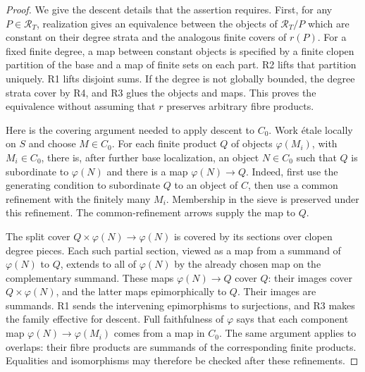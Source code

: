 \begin{proof}
We give the descent details that the assertion requires. First, for
any $P\in\mathscr R_T$, realization gives an equivalence between the
objects of $\mathscr R_T/P$ which are constant on their degree strata
and the analogous finite covers of $r(P)$. For a fixed finite degree,
a map between constant objects is specified by a finite clopen
partition of the base and a map of finite sets on each part. R2 lifts
that partition uniquely. R1 lifts disjoint sums. If the degree is not
globally bounded, the degree strata cover by R4, and R3 glues the
objects and maps. This proves the equivalence without assuming that
$r$ preserves arbitrary fibre products.

Here is the covering argument needed to apply descent to $C_0$.
Work \'etale locally on $S$ and choose $M\in C_0$. For each finite
product $Q$ of objects $\varphi(M_i)$, with $M_i\in C_0$, there
is, after further base localization, an object $N\in C_0$ such that
$Q$ is subordinate to $\varphi(N)$ and there is a map
$\varphi(N)\to Q$. Indeed, first use the generating condition to
subordinate $Q$ to an object of $C$, then use a common refinement
with the finitely many $M_i$. Membership in the sieve is preserved
under this refinement. The common-refinement arrows supply the
map to $Q$.

The split cover $Q\times\varphi(N)\to\varphi(N)$ is covered by
its sections over clopen degree pieces. Each such partial section,
viewed as a map from a summand of $\varphi(N)$ to $Q$, extends to
all of $\varphi(N)$ by the already chosen map on the complementary
summand. These maps $\varphi(N)\to Q$ cover $Q$: their images
cover $Q\times\varphi(N)$, and the latter maps epimorphically
to $Q$. Their images are summands. R1 sends the intervening
epimorphisms to surjections, and R3 makes the family effective for
descent. Full faithfulness of $\varphi$ says that each component
map $\varphi(N)\to\varphi(M_i)$ comes from a map in $C_0$.
The same argument applies to overlaps: their fibre products are
summands of the corresponding finite products. Equalities and
isomorphisms may therefore be checked after these refinements.


\end{proof}
